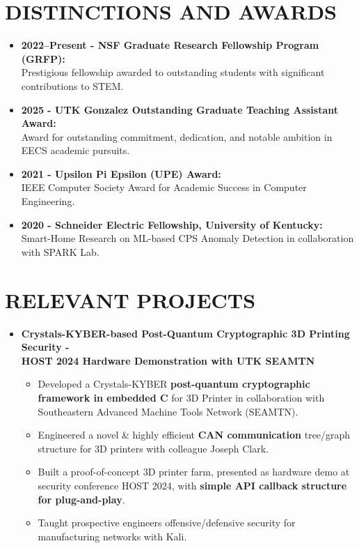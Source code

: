 \documentclass[line,margin,9pt]{res}
\begin{document}
\begin{resume}
\begin{itemize}
\end{itemize}

\section{DISTINCTIONS AND AWARDS}
\begin{itemize}
\item \textbf{2022--Present - NSF Graduate Research Fellowship Program (GRFP):} \\
Prestigious fellowship awarded to outstanding students with significant contributions to STEM.
\item \textbf{2025 - UTK Gonzalez Outstanding Graduate Teaching Assistant Award: } \\
Award for outstanding commitment, dedication, and notable ambition in EECS academic pursuits.
\item \textbf{2021 - Upsilon Pi Epsilon (UPE) Award:} \\
IEEE Computer Society Award for Academic Success in Computer Engineering.
\item \textbf{2020 - Schneider Electric Fellowship, University of Kentucky:} \\
Smart-Home Research on ML-based CPS Anomaly Detection in collaboration with SPARK Lab.

\end{itemize}

\section{RELEVANT PROJECTS}
\begin{itemize}

\item \textbf{Crystals-KYBER-based Post-Quantum Cryptographic 3D Printing Security - \\
	\small{HOST 2024 Hardware Demonstration with UTK SEAMTN}}
\begin{itemize}
\item Developed a Crystals-KYBER \textbf{post-quantum cryptographic framework in embedded C} for 3D Printer in collaboration with Southeastern Advanced Machine Tools Network (SEAMTN).
\item Engineered a novel \& highly efficient \textbf{CAN communication} tree/graph structure for 3D printers with colleague Joseph Clark.
\item Built a proof-of-concept 3D printer farm, presented as hardware demo at security conference HOST 2024, with \textbf{simple API callback structure for plug-and-play}.
\item Taught prospective engineers offensive/defensive security for manufacturing networks with Kali.
\end{itemize}


\end{itemize}
\end{resume}
\end{document}
